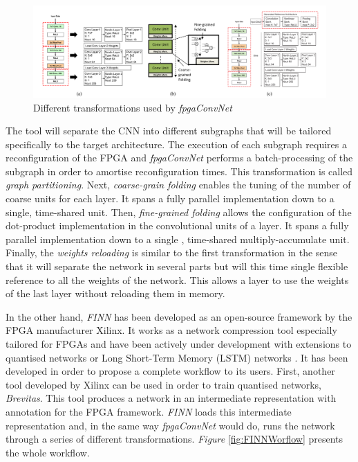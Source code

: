 \begin{figure}[htbp]
	\centering
		\includegraphics[width=\textwidth]{Figures/fpgaConvNetTransformations.png}
	\caption[Inference Optimisations]{Different transformations used by \emph{fpgaConvNet} \cite{Venieris2017}}
	\label{fig:fpgaConvNetTransformations}
\end{figure}


The tool will separate the CNN into different subgraphs that will be tailored specifically to the target architecture. The execution of each subgraph requires a reconfiguration of the FPGA and \emph{fpgaConvNet} performs a batch-processing of the subgraph in order to amortise reconfiguration times. This transformation is called \emph{graph partitioning}. Next, \emph{coarse-grain folding} enables the tuning of the number of coarse units for each layer. It spans a fully parallel implementation down to a single, time-shared unit. Then, \emph{fine-grained folding} allows the configuration of the dot-product implementation in the convolutional units of a layer. It spans a fully parallel implementation down to a single , time-shared multiply-accumulate unit. Finally, the \emph{weights reloading} is similar to the first transformation in the sense that it will separate the network in several parts but will this time single flexible reference to all the weights of the network. This allows a layer to use the weights of the last layer without reloading them in memory.

In the other hand, \emph{FINN} \cite{Umuroglu2017} has been developed as an open-source framework by the FPGA manufacturer Xilinx. It works as a network compression tool especially tailored for FPGAs and have been actively under development with extensions to quantised networks \cite{Blott2018} or Long Short-Term Memory (LSTM) networks \cite{Rybalkin2018}. It has been developed in order to propose a complete workflow to its users. First, another tool developed by Xilinx can be used in order to train quantised networks, \emph{Brevitas}. This tool produces a network in an intermediate representation with annotation for the FPGA framework. \emph{FINN} loads this intermediate representation and, in the same way \emph{fpgaConvNet} would do, runs the network through a series of different transformations. \emph{Figure} \ref{fig:FINNWorflow} presents the whole workflow.

